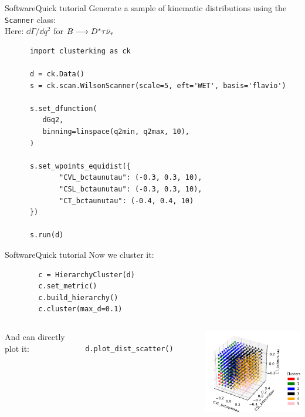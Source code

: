 \begin{frame}[t, fragile]{Software}{Quick tutorial}
    Generate a sample of kinematic distributions using the \texttt{Scanner} class:\\
    {\footnotesize Here: $\dd\Gamma/\dd q^2$ for $B\longrightarrow D^*\tau\bar\nu_\tau$}
    
    \begin{verbatim}
      import clusterking as ck
       
      d = ck.Data()
      s = ck.scan.WilsonScanner(scale=5, eft='WET', basis='flavio')
        
      s.set_dfunction(
         dGq2,
         binning=linspace(q2min, q2max, 10),
      )
      
      s.set_wpoints_equidist({
             "CVL_bctaunutau": (-0.3, 0.3, 10),
             "CSL_bctaunutau": (-0.3, 0.3, 10),
             "CT_bctaunutau": (-0.4, 0.4, 10)
      })
      
      s.run(d)
    \end{verbatim}
\end{frame}

\begin{frame}[fragile]{Software}{Quick tutorial}
    Now we cluster it: 
    
    \begin{verbatim}
        c = HierarchyCluster(d)
        c.set_metric()
        c.build_hierarchy()
        c.cluster(max_d=0.1)
    \end{verbatim}
    
    \begin{columns}
        And can directly plot it:
        
        \begin{changemargin}{0.32cm}{0cm}
        \begin{verbatim}
            d.plot_dist_scatter()
        \end{verbatim}
        \end{changemargin}
        \centering
        \includegraphics[width=5.5cm]{figures/plots/3d.pdf}
    \end{columns}
\end{frame}


